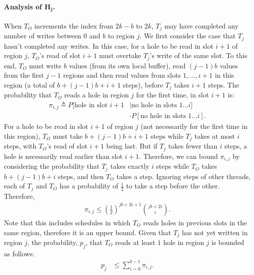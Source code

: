 \paragraph*{Analysis of $\boldsymbol{H_j}$.} When $T_O$ increments the index from $2k-b$ to $2k$, $T_j$ may have completed any number of writes between $0$ and $b$ to region $j$. We first consider the case that $T_j$ hasn't completed any writes. In this case, for a hole to be read in slot $i+1$ of region $j$, $T_O$'s read of slot $i+1$ must overtake $T_j$'s write of the same slot. To this end, $T_O$ must write $b$ values (from its own local buffer), read $(j-1)b$ values from the first $j-1$ regions and then read values from slots $1,\dots,i+1$ in this region (a total of $b+(j-1)b+i+1$ steps), before $T_j$ takes $i+1$ steps. The probability that $T_O$ reads a hole in region $j$ for the first time, in slot $i+1$ is:
\begin{align}
\pi_{i,j} \triangleq P[\text{hole in slot }i+1  &\mid \text{no hole in slots } 1\dots i] \\
                                            & \cdot P[\text{no hole in slots } 1\dots i].
\end{align}
For a hole to be read in slot $i+1$ of region $j$ (not necessarily for the first time in this region), $T_O$ must take $b+(j-1)b+i+1$ steps while $T_j$ takes at most $i$ steps, with $T_O$'s read of slot $i+1$ being last.
But if $T_j$ takes fewer than $i$ steps, a hole is necessarily read earlier than slot $i+1$. Therefore, we can bound $\pi_{i,j}$ by considering the probability that $T_j$ takes exactly $i$ steps while $T_O$ takes $b+(j-1)b+i$ steps, and then $T_O$ takes a step. Ignoring steps of other threads, each of $T_j$ and $T_O$ has a probability of $\frac{1}{2}$ to take a step before the other. Therefore,
\begin{align}
\pi_{i,j} \leq \left(\frac{1}{2}\right)^{jb + 2i +1} {{jb+2i} \choose i}. \label{eq:pi-i-j}
\end{align}
Note that this includes schedules in which $T_O$ reads holes in previous slots in the same region, therefore it is an upper bound.
Given that $T_j$ has not yet written in region $j$, the probability, $p_j$, that $T_O$ reads at least $1$ hole in region $j$ is bounded as follows:
\begin{align}
    p_j &\leq \sum_{i=0}^{b-1} \pi_{i,j}. \label{eq:p-j}
\end{align}

